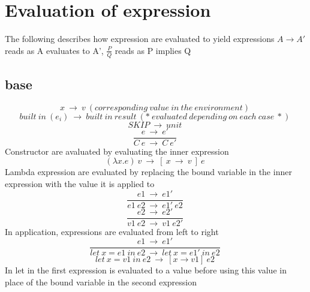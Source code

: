 \documentclass[10pt,a4paper]{article}
\begin{document}
\section*{ Evaluation of expression }
The following describes how expression are evaluated to yield expressions $A \rightarrow  A'$ reads as A evaluates to A', $\frac{P}{Q}$ reads as P implies Q

\subsection*{ base }
\begin{equation}x\ \rightarrow \ v\ (corresponding\ value\ in\ the\ environment)\ \tag{\ E-VARIABLE\ }\end{equation}
\begin{equation}built\ in\ (e_i)\ \rightarrow \ built\ in\ result                           \ (*\ evaluated\ depending\ on\ each\ case\ *)\ \tag{\ E-BUILTIN\ }\end{equation}
\begin{equation}SKIP\ \rightarrow \ unit\ \tag{\ E-SKIP\ }\end{equation}
\begin{equation}\frac{e\ \rightarrow \ e'}{C\ e\ \rightarrow \ C\ e'}\ \tag{\ E-CONST\ }\end{equation}
Constructor are avaluated by evaluating the inner expression
\begin{equation}(\lambda x.e)\ v\ \rightarrow \ [\ x\ \rightarrow \ v\ ]\ e\ \tag{\ E-LAMBDA\ }\end{equation}
Lambda expression are evaluated by replacing the bound variable in the inner expression with the value it is applied to
\begin{equation}\frac{e1\ \rightarrow \ e1'}{e1\ e2\ \rightarrow \ e1'\ e2}\ \tag{\ E-APP1\ }\end{equation}
\begin{equation}\frac{e2\ \rightarrow \ e2'}{v1\ e2\ \rightarrow \ v1\ e2'}\ \tag{\ E-APP2\ }\end{equation}
In application, expressions are evaluated from left to right
\begin{equation}\frac{e1\ \rightarrow \ e1'}{let\ x=e1\ in\ e2\ \rightarrow \ let\ x=e1'\ in\ e2}\ \tag{\ E-LET\ }\end{equation}
\begin{equation}let\ x=v1\ in\ e2\ \rightarrow \ [x\rightarrow v1]\ e2\ \tag{\ E-LETIN\ }\end{equation}
In let in the first expression is evaluated to a value before using this value in place of the bound variable in the second expression 
\end{document}
